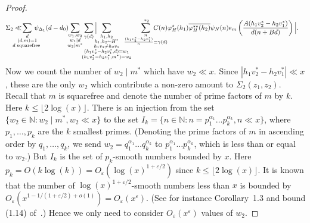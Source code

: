 \documentclass{amsart}
\numberwithin{equation}{section}
\begin{document}
\begin{proof}
\begin{align*}
\Sigma_2
&\ll\!\!\!\!\!\!\!\!\!\!
 \sum_{\substack{d \\ (d,m)=1 \\ d \mbox{\begin{scriptsize}
squarefree
\end{scriptsize}}
}} \!\!\!\!\!\!\!\!\psi_{\Delta_1}(d-d_0)\!\!\sum_{\substack{w_1, w_2 \\ w_1 \mid d \\ w_2 \mid m^*}} \sum_{\substack{\gamma (d) }} \Big| \!\!\!\!\!\!\!\!\!\!\!\!\! \!\!\sum_{\substack{h_1, h_2 \\ h_1, h_2 \sim H^*  \\ h_1v_2 \neq h_2 v_1 \\  (h_1v_2^*-h_2v_1^*,d)=w_1 \\  (h_1v_2^*-h_2v_1^*,m^*)=w_2 }}\!\!\!\!\!\!\!\!  \sum_{\substack{n  \\\frac{(h_1v_2^*-h_2v_1^*)}{n} \equiv \gamma(d) }}^{\,\,*_2} \!\!\!\!\!\!\!\!\!\!\!\!\!\!C(n)\varphi_H^\star(h_1) \overline{\varphi_H^{\star\star}(h_2)}\psi_N(n)   e_{m}\left(\dfrac{A (h_1v_2^*-h_2v_1^*) }{d(n+B d)}\right) \Big|.
\end{align*}
Now we count the number of $w_2 \mid m^*$ which have $w_2 \ll x$. Since $|h_1v_2^*-h_2v_1^*| \ll x$, these are the only $w_2$ which contribute a non-zero amount to $\Sigma_2(z_1,z_2)$. Recall that $m$ is squarefree and denote the number of prime factors of $m$ by $k$. Here $k \leq \lfloor 2\log(x) \rfloor$. There is an injection from  the set $\{w_2 \in \mathbb{N}: w_2 \mid m^*, w_2 \ll x \}$ to the set  $I_k=\{ n \in \mathbb{N}: n=p_1^{\alpha_1}\dots p_{k}^{\alpha_{k}}, n\ll x\}$, where $p_1, \dots, p_k$ are the $k$ smallest primes. 
(Denoting the prime factors of $m$ in ascending order by $q_1, \dots, q_k$, we send $w_2 = q_1^{\alpha_1} \dots q_k^{\alpha_k}$ to $p_1^{\alpha_1} \dots p_k^{\alpha_k}$, which is less than or equal to $w_2$.) But $I_k$ is the set of $p_k$-smooth numbers bounded by $x$. Here $p_k = O(k \log(k)) = O_\varepsilon(\log(x)^{1+\varepsilon/2})$ since $k \leq \lfloor 2\log(x) \rfloor$. It is known that  the number of $\log(x)^{1+\varepsilon/2}$-smooth numbers less than $x$ is bounded by $O_\varepsilon(x^{1-1/(1+\varepsilon/2)+o(1)})=O_\varepsilon(x^\varepsilon)$. (See for instance Corollary~1.3 and  bound (1.14) of~\cite{Hildebrand:1993:IWL}.) Hence we only need to consider $O_\varepsilon(x^\varepsilon)$  values of $w_2$. 
 

\end{proof}
\end{document}
